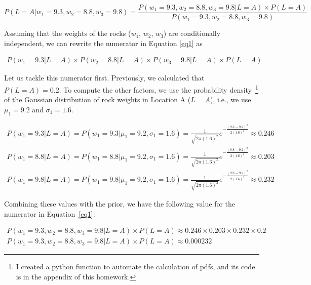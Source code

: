 \documentclass{article}
\begin{document}
\begin{equation}
P(L = A| w_1 = 9.3, w_2 = 8.8, w_3 = 9.8) = \frac{P(w_1 = 9.3, w_2 = 8.8, w_3 = 9.8| L = A) \times P(L = A)}{P(w_1 = 9.3, w_2 = 8.8, w_3 = 9.8)}
\label{eq1}
\end{equation}

Assuming that the weights of the rocks ($w_1$, $w_2$, $w_3$) are conditionally independent, we can rewrite the numerator in Equation \ref{eq1} as

\begin{equation*}
\begin{split}
P(w_1 = 9.3 | L = A) \times P(w_2 = 8.8 | L = A) \times P(w_3 = 9.8| L = A) \times P(L = A)
\end{split}
\end{equation*}

Let us tackle this numerator first. Previously, we calculated that $P(L = A) = 0.2$. To compute the other factors, we use the probability density~\footnote{I created a python function to automate the calculation of pdfs, and its code is in the appendix of this homework.} of the 
Gaussian distribution of rock weights in Location A ($L = A$), i.e., we use $\mu_1 = 9.2$ and $\sigma_1 = 1.6$.

\begin{equation*}
\begin{split}
P(w_1 = 9.3 | L = A) = P(w_1 = 9.3 | \mu_1 = 9.2, \sigma_1 = 1.6) = \frac{1}{\sqrt{2\pi(1.6)^2}}e^{-\frac{(9.3 - 9.2)^2}{2(1.6)^2}} \approx 0.246 
\\
P(w_1 = 8.8 | L = A) = P(w_1 = 8.8 | \mu_1 = 9.2, \sigma_1 = 1.6) = \frac{1}{\sqrt{2\pi(1.6)^2}}e^{-\frac{(8.8 - 9.2)^2}{2(1.6)^2}} \approx 0.203
\\
P(w_1 = 9.8 | L = A) = P(w_1 = 9.8 | \mu_1 = 9.2, \sigma_1 = 1.6) = \frac{1}{\sqrt{2\pi(1.6)^2}}e^{-\frac{(9.8 - 9.2)^2}{2(1.6)^2}} \approx 0.232
\end{split}
\end{equation*}
  
Combining these values with the prior, we have the following value for the numerator in Equation~\ref{eq1}:

\begin{equation*}
\begin{split}
P(w_1 = 9.3, w_2 = 8.8, w_3 = 9.8| L = A) \times P(L = A) \approx 0.246 \times 0.203 \times 0.232 \times 0.2
\\
P(w_1 = 9.3, w_2 = 8.8, w_3 = 9.8| L = A) \times P(L = A) \approx 0.000232
\end{split} 
\end{equation*}
\end{document}
